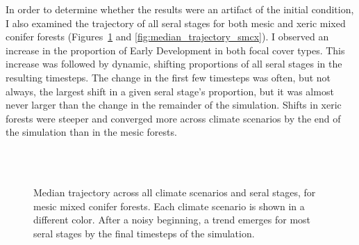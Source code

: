 In order to determine whether the results were an artifact of the initial condition, I also examined the trajectory of all seral stages for both mesic and xeric mixed conifer forests (Figures~\ref{fig:median_trajectory_smcm} and \ref{fig:median_trajectory_smcx}). I observed an increase in the proportion of Early Development in both focal cover types. This increase was followed by dynamic, shifting proportions of all seral stages in the resulting timesteps. The change in the first few timesteps was often, but not always, the largest shift in a given seral stage's proportion, but it was almost never larger than the change in the remainder of the simulation. Shifts in xeric forests were steeper and converged more across climate scenarios by the end of the simulation than in the mesic forests.







\begin{figure}[htbp]
 \captionsetup[subfigure]{labelformat=empty}
  \centering
  \\%
   \\
    \caption{Median trajectory across all climate scenarios and seral stages, for mesic mixed conifer forests. Each climate scenario is shown in a different color. After a noisy beginning, a trend emerges for most seral stages by the final timesteps of the simulation.}
  \label{fig:median_trajectory_smcm}
\end{figure} 

